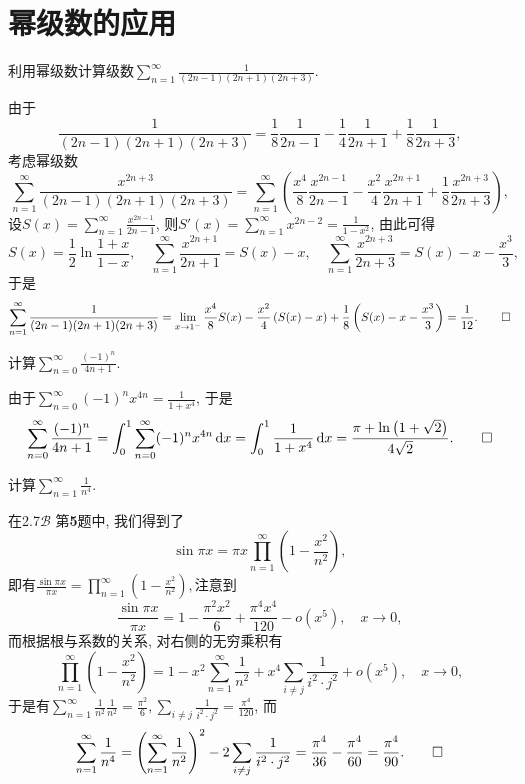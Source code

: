 \section{幂级数的应用}
\begin{quiza}
\woe 利用幂级数计算级数\(\sum_{n=1}^{\infty}\frac{1}{(2n-1)(2n+1)(2n+3)}\).
\begin{solution}
由于\[\frac{1}{(2n-1)(2n+1)(2n+3)}=\frac{1}{8}\frac{1}{2n-1}-\frac{1}{4}\frac{1}{2n+1}+\frac{1}{8}\frac{1}{2n+3},\]考虑幂级数\[\sum_{n=1}^{\infty}\frac{x^{2n+3}}{(2n-1)(2n+1)(2n+3)}=\sum_{n=1}^{\infty}\left(\frac{x^4}{8}\frac{x^{2n-1}}{2n-1}-\frac{x^2}{4}\frac{x^{2n+1}}{2n+1}+\frac{1}{8}\frac{x^{2n+3}}{2n+3}\right),\]设\(S(x)=\sum_{n=1}^{\infty}\frac{x^{2n-1}}{2n-1}\), 则\(S'(x)=\sum_{n=1}^{\infty}x^{2n-2}=\frac{1}{1-x^2}\), 由此可得\[S(x)=\frac{1}{2}\ln\frac{1+x}{1-x},\quad\sum_{n=1}^{\infty}\frac{x^{2n+1}}{2n+1}=S(x)-x,\quad\sum_{n=1}^{\infty}\frac{x^{2n+3}}{2n+3}=S(x)-x-\frac{x^3}{3},\]于是\[\sum_{n=1}^{\infty}\frac{1}{(2n-1)(2n+1)(2n+3)}=\lim_{x\rightarrow 1^-}\frac{x^4}{8}S(x)-\frac{x^2}{4}\left(S(x)-x\right)+\frac{1}{8}\left(S(x)-x-\frac{x^3}{3}\right)=\frac{1}{12}.\qedhere\]
\end{solution}
\woe 计算\(\sum_{n=0}^{\infty}\frac{(-1)^n}{4n+1}\).
\begin{solution}
由于\(\sum_{n=0}^{\infty}(-1)^nx^{4n}=\frac{1}{1+x^4}\), 于是\[\sum_{n=0}^{\infty}\frac{(-1)^n}{4n+1}=\int_{0}^{1}\sum_{n=0}^{\infty}(-1)^nx^{4n}\,\mathrm{d} x=\int_{0}^{1}\frac{1}{1+x^4}\,\mathrm{d} x=\frac{\pi+\ln\left(1+\sqrt{2}\right)}{4\sqrt{2}}.\qedhere\]
\end{solution}
\woe 计算\(\sum_{n=1}^{\infty}\frac{1}{n^4}\).
\begin{solution}
在2.7\(\boldsymbol{\mathcal{B}}\) 第\textbf{5}题中, 我们得到了\[\sin\pi x=\pi x\prod_{n=1}^{\infty}\left(1-\frac{x^2}{n^2}\right),\]即有\(\frac{\sin \pi x}{\pi x}=\prod_{n=1}^{\infty}\left(1-\frac{x^2}{n^2}\right),\)注意到\[\frac{\sin \pi x}{\pi x}=1-\frac{\pi ^2 x^2}{6}+\frac{\pi ^4 x^4}{120}-o\left(x^5\right),\quad x\rightarrow 0,\]而根据根与系数的关系, 对右侧的无穷乘积有\[\prod_{n=1}^{\infty}\left(1-\frac{x^2}{n^2}\right)=1-x^2\sum_{n=1}^{\infty}\frac{1}{n^2}+x^4\sum_{i\ne j}\frac{1}{i^2\cdot j^2}+o\left(x^5\right),\quad x\rightarrow 0,\]于是有\(\sum_{n=1}^{\infty}\frac{1}{n^2}\frac{1}{n^2}=\frac{\pi^2}{6},\sum_{i\ne j}\frac{1}{i^2\cdot j^2}=\frac{\pi^4}{120}\), 而\[\sum_{n=1}^{\infty}\frac{1}{n^4}=\left(\sum_{n=1}^{\infty}\frac{1}{n^2}\right)^2-2\sum_{i\ne j}\frac{1}{i^2\cdot j^2}=\frac{\pi^4}{36}-\frac{\pi^4}{60}=\frac{\pi^4}{90}.\qedhere\]

\end{solution}
\end{quiza}

